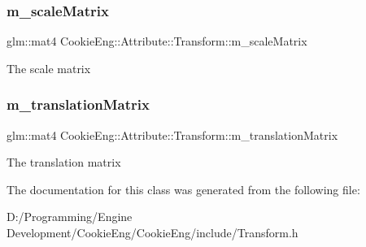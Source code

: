 \subsubsection{\texorpdfstring{m\+\_\+scale\+Matrix}{m\_scaleMatrix}}
{\footnotesize\ttfamily glm\+::mat4 Cookie\+Eng\+::\+Attribute\+::\+Transform\+::m\+\_\+scale\+Matrix\hspace{0.3cm}{\ttfamily [protected]}}

The scale matrix \mbox{\label{class_cookie_eng_1_1_attribute_1_1_transform_afcc22a217351ce018b14d4216012c3a6}} 
\subsubsection{\texorpdfstring{m\+\_\+translation\+Matrix}{m\_translationMatrix}}
{\footnotesize\ttfamily glm\+::mat4 Cookie\+Eng\+::\+Attribute\+::\+Transform\+::m\+\_\+translation\+Matrix\hspace{0.3cm}{\ttfamily [protected]}}

The translation matrix 

The documentation for this class was generated from the following file\+:\begin{DoxyCompactItemize}
\item 
D\+:/\+Programming/\+Engine Development/\+Cookie\+Eng/\+Cookie\+Eng/include/Transform.\+h\end{DoxyCompactItemize}
